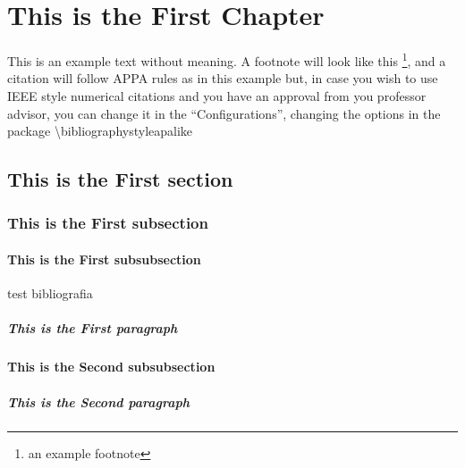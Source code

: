 \chapter{ This is the First Chapter}
This is an example text without meaning. A footnote will look like this \footnote{an example footnote}, and a citation will follow APPA rules as in this example \cite{Deterding2011} but, in case you wish to use IEEE style numerical citations and you have an approval from you professor advisor, you can change it in the ``Configurations'', changing the options in the package \textbackslash bibliographystyle{apalike}	
\lipsum[1-2]\\

\section{ This is the First section}
\lipsum[2-4]

\subsection{ This is the First subsection}
\lipsum[1-2]

\subsubsection{ This is the First subsubsection}
\lipsum[1-1]
test bibliografia \cite{Yampolsky2016}

\paragraph{ This is the First paragraph}
\lipsum[1-1]


\subsubsection{ This is the Second subsubsection}
\lipsum[1-1]

\paragraph{ This is the Second paragraph}
\lipsum[1-1]



